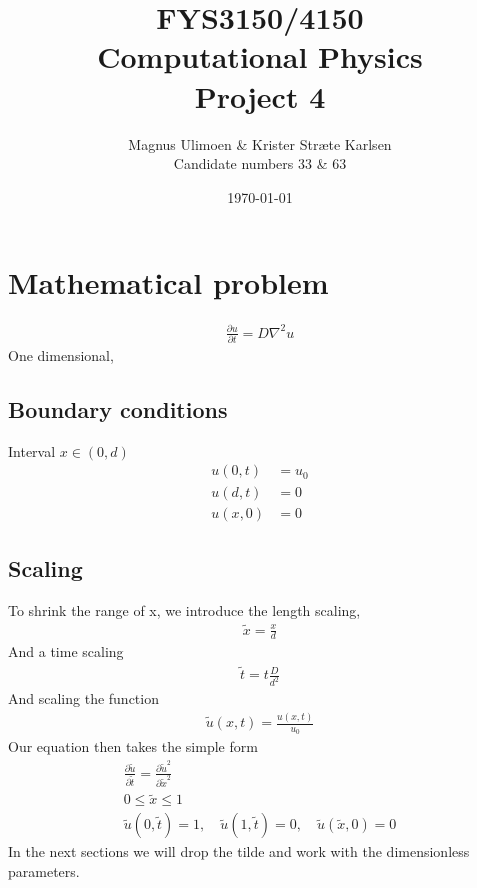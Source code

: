 \documentclass[11pt,a4paper,draft]{article}
\title{FYS3150/4150\\Computational Physics\\Project 4}
\author{Magnus Ulimoen \& Krister Stræte Karlsen\\
Candidate numbers 33 \& 63}
\date{\today}
\numberwithin{equation}{section}
\begin{document}
\maketitle

\section{Mathematical problem}

\begin{gather}
\frac{\partial u}{\partial t} = D\nabla^2u
\end{gather}
One dimensional,
\subsection{Boundary conditions}
Interval $x \in (0, d)$
\begin{align}
u(0,t) &= u_0\\
u(d,t) &= 0\\
u(x,0) &= 0
\end{align}

\subsection{Scaling}

To shrink the range of x, we introduce the length scaling,
\begin{gather}
\tilde{x} = \frac{x}{d}
\end{gather}
And a time scaling
\begin{gather}
\tilde{t} = t\frac{D}{d^2}
\end{gather}
And scaling the function
\begin{gather}
\tilde{u}(x,t) = \frac{u(x,t)}{u_0}
\end{gather}
Our equation then takes the simple form
\begin{gather}
\frac{\partial \tilde{u}}{\partial \tilde{t}}
= \frac{\partial \tilde{u}^2}{\partial \tilde{x}^2}\\
0 \le \tilde{x} \le 1\\
\tilde{u}(0,\tilde{t})
= 1, \quad \tilde{u}(1,\tilde{t}) = 0, \quad \tilde{u}(\tilde{x}, 0 ) = 0
\end{gather}
In the next sections we will drop the tilde and work with the 
dimensionless parameters.
\end{document}
